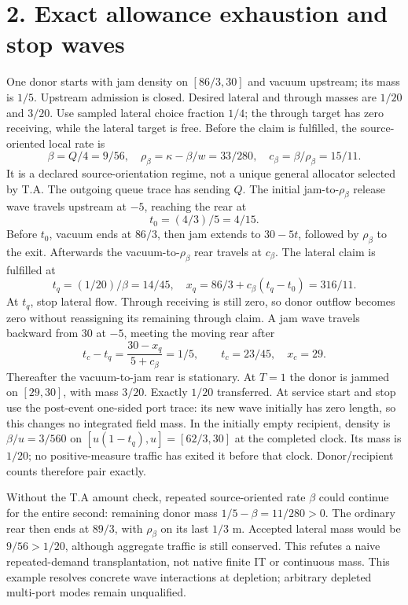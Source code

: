 \documentclass[11pt,a4paper]{article}
\begin{document}
\newpage
\section*{2. Exact allowance exhaustion and stop waves}
One donor starts with jam density on $[86/3,30]$ and vacuum upstream; its
mass is $1/5$. Upstream admission is closed. Desired lateral and through
masses are $1/20$ and $3/20$. Use sampled lateral choice fraction $1/4$;
the through target has zero receiving, while the lateral target is free.
Before the claim is fulfilled, the source-oriented local rate is
\begin{equation}
 \beta=Q/4=9/56,\quad \rho_\beta=\kappa-\beta/w=33/280,\quad
 c_\beta=\beta/\rho_\beta=15/11.
\end{equation}
It is a declared source-orientation regime, not a unique general allocator
selected by T.A. The outgoing queue trace has sending $Q$. The initial
jam-to-$\rho_\beta$ release wave travels upstream at $-5$, reaching the
rear at
\begin{equation}
 t_0=(4/3)/5=4/15.
\end{equation}
Before $t_0$, vacuum ends at $86/3$, then jam extends to $30-5t$, followed
by $\rho_\beta$ to the exit. Afterwards the vacuum-to-$\rho_\beta$ rear
travels at $c_\beta$. The lateral claim is fulfilled at
\begin{equation}
 t_q=(1/20)/\beta=14/45,\quad
 x_q=86/3+c_\beta(t_q-t_0)=316/11.
\end{equation}
At $t_q$, stop lateral flow. Through receiving is still zero, so donor outflow
becomes zero without reassigning its remaining through claim. A jam wave
travels backward from 30 at $-5$, meeting the moving rear after
\begin{equation}
 t_c-t_q=\frac{30-x_q}{5+c_\beta}=1/5,\qquad
 t_c=23/45,\quad x_c=29.
\end{equation}
Thereafter the vacuum-to-jam rear is stationary. At $T=1$ the donor is
jammed on $[29,30]$, with mass $3/20$. Exactly $1/20$ transferred.
At service start and stop use the post-event one-sided port trace: its new
wave initially has zero length, so this changes no integrated field mass.
In the initially empty recipient, density is $\beta/u=3/560$ on
$[u(1-t_q),u]=[62/3,30]$ at the completed clock. Its mass is $1/20$;
no positive-measure traffic has exited it before that clock. Donor/recipient
counts therefore pair exactly.

Without the T.A amount check, repeated source-oriented rate $\beta$ could
continue for the entire second: remaining donor mass $1/5-\beta=11/280>0$.
The ordinary rear then ends at $89/3$, with $\rho_\beta$ on its last $1/3$ m.
Accepted lateral mass would be $9/56>1/20$, although aggregate traffic is still
conserved. This refutes a naive repeated-demand transplantation, not native
finite IT or continuous mass. This example resolves concrete wave interactions
at depletion; arbitrary depleted multi-port modes remain unqualified.
\end{document}
